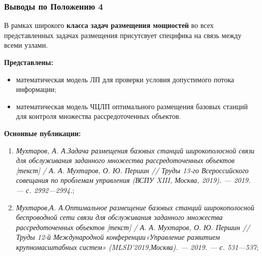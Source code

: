 \begin{frame}
    \frametitle{Выводы по Положению 4}
    \fontsize{8pt}{7.2}\selectfont

    В рамках широкого \textbf{класса задач размещения мощностей} во всех представленных задачах размещения присутсвует специфика на связь между всеми узлами. 
    \bigskip

    \textbf{Представлены:}
    \begin{itemize}
        \item математическая модель ЛП для проверки условия допустимого потока информации;
        \item математическая модель ЧЦЛП оптимального размещения базовых станций для контроля множества рассредоточенных объектов.
    \end{itemize}

    \bigskip
    \textbf{Оснонвые публикации:}
    \begin{minipage}[c]{1\linewidth}
        \fontsize{6pt}{7.2}\selectfont
        \begin{enumerate}
            \item \textit{Мухтаров, А. А.Задача размещения базовых станций широкопо­лосной связи для обслуживания заданного множества рассредото­ченных объектов [текст] / А. А. Мухтаров, О. Ю. Першин // Труды 13-го Всероссийского совещания по проблемам управления (ВСПУ XIII, Москва, 2019). — 2019. — с. 2992—2994.};
            
            \item \textit{Мухтаров,А. А.Оптимальное размещение базовых станций широ­кополосной беспроводной сети связи для обслуживания заданного множества рассредоточенных объектов [текст] / А. А. Мухта­ров, О. Ю. Першин // Труды 12-й Международной конференции«Управление развитием крупномасштабных систем» (MLSD’2019,Москва). — 2019. — с. 531—537};
            
        \end{enumerate}
    \end{minipage}

\end{frame}

